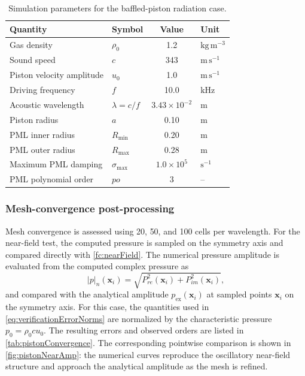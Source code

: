 \documentclass[final,num,12pt]{elsarticle}
\newcommand{\x}{\mathbf{x}}
\begin{document}
\begin{table}[H]
    \centering
    \caption{Simulation parameters for the baffled-piston radiation case.}
    \label{tab:paramsPiston}
    \begin{tabular}{llcl}
        \toprule
        Quantity & Symbol & Value & Unit \\
        \midrule
        Gas density & $\rho_0$ & 1.2 & $\mathrm{kg\,m^{-3}}$ \\
        Sound speed & $c$ & 343 & $\mathrm{m\,s^{-1}}$ \\
        Piston velocity amplitude & $u_0$ & 1.0 & $\mathrm{m\,s^{-1}}$ \\
        Driving frequency & $f$ & 10.0 & $\mathrm{kHz}$ \\
        Acoustic wavelength & $\lambda=c/f$ & $3.43\times10^{-2}$ & $\mathrm{m}$ \\
        Piston radius & $a$ & 0.10 & $\mathrm{m}$ \\
        PML inner radius & $R_{\min}$ & 0.20 & $\mathrm{m}$ \\
        PML outer radius & $R_{\max}$ & 0.28 & $\mathrm{m}$ \\
        Maximum PML damping & $\sigma_{\max}$ & $1.0\times10^5$ & $\mathrm{s^{-1}}$ \\
        PML polynomial order & $po$ & 3 & -- \\
        \bottomrule
    \end{tabular}
\end{table}

\subsubsection{Mesh-convergence post-processing}
Mesh convergence is assessed using 20, 50, and 100 cells per wavelength.  For
the near-field test, the computed pressure is sampled on the symmetry axis and
compared directly with \cref{fc:nearField}.  The numerical pressure amplitude is
evaluated from the computed complex pressure as
\begin{equation}
    |p|_n(\x_i)=\sqrt{P_{re}^2(\x_i)+P_{im}^2(\x_i)} ,
\end{equation}
and compared with the analytical amplitude $p_{\mathrm{ex}}(\x_i)$ at sampled
points $\x_i$ on the symmetry axis. For this case, the quantities used in
\cref{eq:verificationErrorNorms} are normalized by the characteristic pressure
$p_0=\rho_0 c u_0$.
The resulting errors and observed orders are listed in
\cref{tab:pistonConvergence}.  The corresponding pointwise comparison is shown
in \cref{fig:pistonNearAmp}: the numerical curves reproduce the oscillatory
near-field structure and approach the analytical amplitude as the mesh is
refined.
\end{document}

